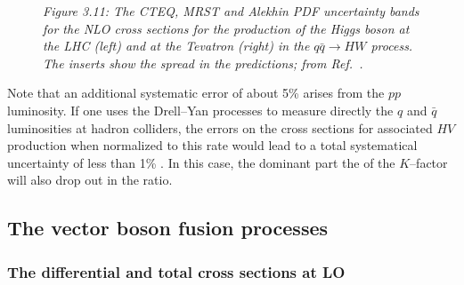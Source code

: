 \begin{figure}[hbtp]
\begin{center}
\vspace*{-2.5cm}
\hspace*{-1cm}
\vspace*{-15.5cm}
\end{center}
{\it Figure 3.11: The CTEQ, MRST and Alekhin PDF uncertainty bands for the NLO
cross sections for the production of the Higgs boson at the LHC (left) and at
the Tevatron (right) in the $q\bar{q} \to HW$  process.  The inserts 
show the spread in the predictions; from Ref.~\cite{Samir}.}
\vspace*{-1mm} 
\end{figure}

Note that an additional systematic error of about 5\% arises from the $pp$
luminosity. If one uses the Drell--Yan processes to measure directly the $q$ and
$\bar q$ luminosities at hadron colliders, the errors on the cross sections for
associated $HV$ production when normalized to this rate would lead to a total 
systematical uncertainty of less than 1\% \cite{Dittmar}. In this case, the
dominant part the of the $K$--factor will also drop out in the ratio.  

\subsection{The vector boson fusion processes}

\subsubsection{The differential and total cross sections at LO}

